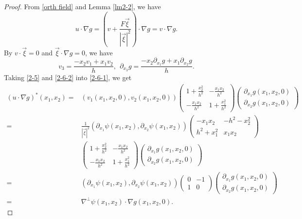 \documentclass[12pt,reqno]{amsart}
\numberwithin{equation}{section}
\theoremstyle{definition}
\theoremstyle{remark}
\begin{document}
\begin{proof}
From \eqref{orth field} and Lemma \ref{lm2-2}, we have
\begin{equation}\label{2-6-1}
u  \cdot \nabla g=\left(v+\frac{F\vec{\xi}}{|\vec{\xi}|^2}\right)  \cdot \nabla g=	v \cdot \nabla g. 
\end{equation}
By $v\cdot \vec{\xi}=0$ and $ \vec{\xi}\cdot \nabla g=0 $, we have
\begin{equation}\label{2-6-2}
v_3=\frac{ -x_2v_1+x_1v_2}{h},\ \ \partial_{x_3} g=\frac{-x_2\partial_{x_1} g+x_1\partial_{x_2} g}{h}.
\end{equation}
Taking  \eqref{2-5} and \eqref{2-6-2} into \eqref{2-6-1}, we get
\begin{equation*} 
\begin{split}
(u \cdot \nabla g)^*(x_1,x_2)=&(v_1(x_1,x_2,0),v_2(x_1,x_2,0))\begin{pmatrix}
1+\frac{x_2^2}{h^2} &   -\frac{x_1x_2}{h^2}  \\
-\frac{x_1x_2}{h^2} & 1+\frac{x_1^2}{h^2}
\end{pmatrix}  \begin{pmatrix}
\partial_{x_1}g(x_1,x_2,0) \\
\partial_{x_2}g(x_1,x_2,0)
\end{pmatrix}\\
=&\frac{1}{|\vec{\xi}|^2}\left (\partial_{x_1}\psi(x_1,x_2), \partial_{x_2}\psi(x_1,x_2)\right )\begin{pmatrix}
- x_1x_2 &  -h^2-x_2^2  \\ 
 h^2+x_1^2  &  x_1x_2
\end{pmatrix}\\  
&\begin{pmatrix}
1+\frac{x_2^2}{h^2} &   -\frac{x_1x_2}{h^2}  \\
-\frac{x_1x_2}{h^2} & 1+\frac{x_1^2}{h^2}
\end{pmatrix}
  \begin{pmatrix}
\partial_{x_1}g(x_1,x_2,0) \\
\partial_{x_2}g(x_1,x_2,0)
\end{pmatrix}\\
=&\left (\partial_{x_1}\psi(x_1,x_2), \partial_{x_2}\psi(x_1,x_2)\right )\begin{pmatrix}
0 &  -1 \\ 
1  & 0
\end{pmatrix}   \begin{pmatrix}
\partial_{x_1}g(x_1,x_2,0) \\
\partial_{x_2}g(x_1,x_2,0)
\end{pmatrix}\\
=&\nabla^\perp\psi(x_1,x_2)\cdot\nabla g(x_1,x_2,0).
\end{split}
\end{equation*}
\end{proof}
\end{document}
